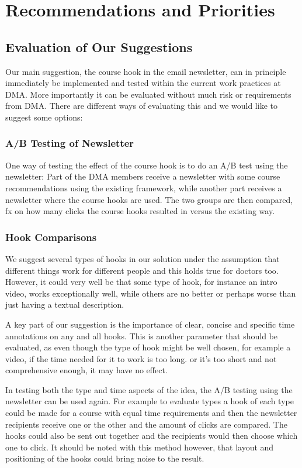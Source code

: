 \section{Recommendations and Priorities}
\label{sec:recommendations}
\subsection{Evaluation of Our Suggestions}

Our main suggestion, the course hook in the email newsletter, can in principle immediately be implemented and tested within the current work practices at DMA. More importantly it can be evaluated without much risk or requirements from DMA. There are different ways of evaluating this and we would like to suggest some options:

\subsubsection{A/B Testing of Newsletter}
One way of testing the effect of the course hook is to do an A/B test using the newsletter: Part of the DMA members receive a newsletter with some course recommendations using the existing framework, while another part receives a newsletter where the course hooks are used. The two groups are then compared, fx on how many clicks the course hooks resulted in versus the existing way.

\subsubsection{Hook Comparisons}
We suggest several types of hooks in our solution under the assumption that different things work for different people and this holds true for doctors too. However, it could very well be that some type of hook, for instance an intro video, works exceptionally well, while others are no better or perhaps worse than just having a textual description.

A key part of our suggestion is the importance of clear, concise and specific time annotations on any and all hooks. This is another parameter that should be evaluated, as even though the type of hook might be well chosen, for example a video, if the time needed for it to work is too long. or it’s too short and not comprehensive enough, it may have no effect.

In testing both the type and time aspects of the idea, the A/B testing using the newsletter can be used again. For example to evaluate types a hook of each type could be made for a course with equal time requirements and then the newsletter recipients receive one or the other and the amount of clicks are compared. The hooks could also be sent out together and the recipients would then choose which one to click. It should be noted with this method however, that layout and positioning of the hooks could bring noise to the result.

